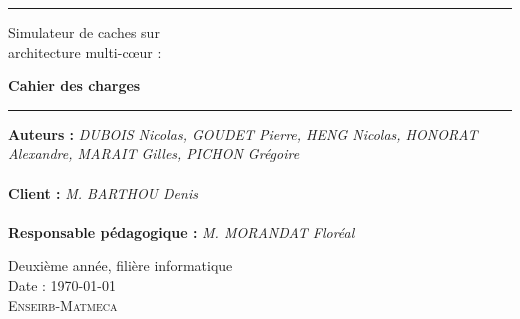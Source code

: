 \thispagestyle{empty}

\hrule
\begin{flushleft}
\huge{Simulateur de caches sur\\architecture multi-c\oe ur :}\\
\end{flushleft}
\begin{flushright}
\Huge\textbf{Cahier des charges}\\
\end{flushright}
\hrule

\noindent\textbf{Auteurs :}
\emph{DUBOIS Nicolas, GOUDET Pierre, HENG Nicolas, HONORAT Alexandre, MARAIT Gilles, PICHON Grégoire}\\
\\
\noindent\textbf{Client :}
\emph{M. BARTHOU Denis}\\
\\
\noindent\textbf{Responsable pédagogique :}
\emph{M. MORANDAT Floréal} 

\normalsize
\begin{center}
  Deuxième année, filière informatique\\
  Date : \today\\
  \textsc{Enseirb-Matmeca}
\end{center}
